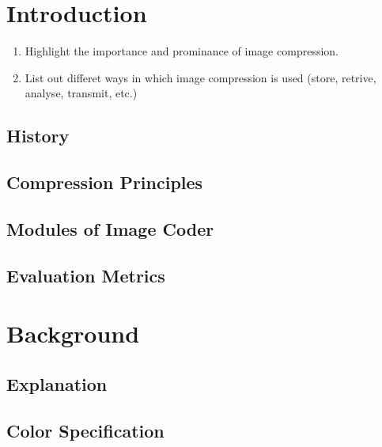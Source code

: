 \documentclass[review,onefignum,onetabnum]{siamart190516}
\begin{document}
\maketitle


\section{Introduction}
\begin{enumerate}
  \item Highlight the importance and prominance of image compression.
  \item List out differet ways in which image compression is used (store, retrive, analyse, transmit, etc.)
\end{enumerate}

\subsection{History}
\lipsum[3-4]

\subsection{Compression Principles}
\lipsum[5-6]

\subsection{Modules of Image Coder}
\lipsum[6-9]

\subsection{Evaluation Metrics}
\lipsum[10-11]

\section{Background}
\subsection{Explanation}
\lipsum[12]

\subsection{Color Specification}
\lipsum[13-14]
\end{document}
